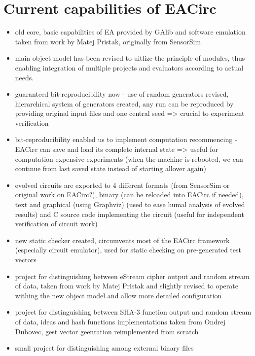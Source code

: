 \documentclass[12pt,oneside]{fithesis2}
\begin{document}
\section{Current capabilities of EACirc}
\label{sec:eacirc-capabilities}

\begin{itemize}
\item old core, basic capabilities of EA provided by GAlib and software emulation taken from work by Matej Pristak, originally from SensorSim
\item main object model has been revised to uitlize the principle of modules, thus enabling integration of multiple projects and evaluators according to actual needs.
\item guaranteed bit-reproducibility now - use of random generators revised, hierarchical system of generators created, any run can be reproduced by providing original input files and one central seed => crucial to experiment verification
\item bit-reproducibility enabled us to implement computation recommencing - EACirc can save and load its complete internal state => useful for computation-expensive experiments (when the machine is rebooted, we can continue from last saved state instead of starting allover again)
\item evolved circuits are exported to 4 different formats (from SensorSim or original work on EACirc?), binary (can be reloaded into EACirc if needed), text and graphical (using Graphviz) (used to ease humal analysis of evolved results) and C source code implementing the circuit (useful for independent verification of circuit work)
\item new static checker created, circumvents most of the EACirc framework (especially circuit emulator), used for static checking on pre-generated test vectors
\item project for distinguishing between eStream cipher output and random stream of data, taken from work by Matej Pristak and slightly revised to operate withing the new object model and allow more detailed configuration
\item project for distinguishing between SHA-3 function output and random stream of data, ideas and hash functions implementations taken from Ondrej Dubovec, gest vector geenration reimplemented from scratch
\item small project for distinguishing among external binary files
\end{itemize}
\end{document}
